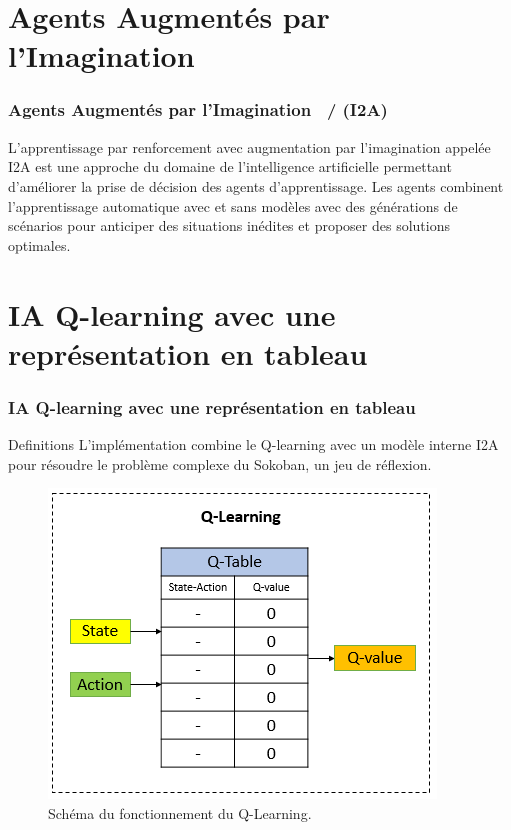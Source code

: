\documentclass[
	11pt, %
]{beamer}
\begin{document}
\section{Agents Augmentés par l'Imagination}

\begin{frame}
	\frametitle{Agents Augmentés par l'Imagination \ / (I2A)}

	\smallskip %

	\begin{definition}
	\alert{L'apprentissage par renforcement avec augmentation par l'imagination} appelée \alert{I2A} est une approche du domaine de l'intelligence artificielle permettant d'améliorer la prise de décision des agents d'apprentissage.
	Les agents combinent l'apprentissage automatique avec et sans modèles avec des générations de scénarios pour anticiper des situations inédites et proposer des solutions optimales.
	\end{definition}

	\smallskip %

\end{frame}


\section{IA Q-learning avec une représentation en tableau}

\begin{frame}
	\frametitle{IA Q-learning avec une représentation en tableau}

	\begin{block}{Definitions}
		L'implémentation combine le Q-learning avec un modèle interne I2A pour résoudre le problème complexe du Sokoban, un jeu de réflexion.
	\end{block}

	\smallskip %

	\begin{figure}
		\includegraphics[width=0.5\linewidth]{Images/q_learning.png}
		\caption{Schéma du fonctionnement du Q-Learning.}
	\end{figure}


\end{frame}
\end{document}
